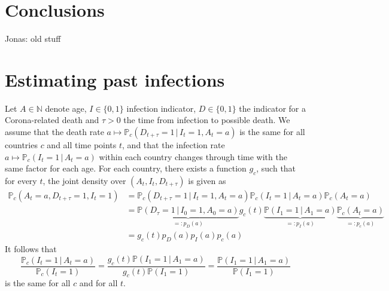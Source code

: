 \documentclass[a4paper]{article}
\newcommand\N{\mathbb{N}}
\renewcommand\P{\mathbb{P}}
\newcommand{\given}{\, \vert \,}
\newcommand\Jonas[1]{{\color{red}Jonas: #1}}
\begin{document}
\section{Conclusions}

\begin{center}
\end{center}




\Jonas{old stuff

\section{Estimating past infections}

Let $A \in \N$ denote age, $I \in \{0,1\}$ infection indicator, $D \in \{0,1\}$ the indicator for a Corona-related death and $\tau > 0$
the time from infection to possible death. We assume that the death rate $a \mapsto \P_c(D_{t+\tau} = 1 \given I_t = 1, A_t = a)$ is 
the same for all countries $c$ and all time points $t$, and that the infection rate $a \mapsto \P_c(I_{t} = 1 \given A_t = a)$ within 
each country changes through time with the same factor for each age. For each country, there exists a function $g_c$, such that for every $t$, the joint
density over $(A_t,I_t,D_{t+\tau})$ is given as
%
\begin{align*}
\P_c(A_t = a, D_{t+\tau} = 1, I_t = 1)	&= \P_c(D_{t+\tau} = 1 \given I_t = 1, A_t = a)  \P_c(I_t = 1 \given A_t = a) \P_c(A_t = a) \\
															&= \underbrace{\P(D_{\tau} = 1 \given I_0 = 1, A_0 = a)}_{=:p_D(a)} g_c(t) \underbrace{\P(I_1 = 1 \given A_1 = a)}_{=:p_I(a)} \underbrace{\P_c(A_t = a)}_{=:p_c(a)} \\
															&=  g_c(t) p_D(a) p_I(a) p_c(a)
\end{align*}
%
It follows that 
$$
\frac{\P_c(I_t = 1 \given A_t = a)}{\P_c(I_t = 1)} = \frac{g_c(t) \P(I_1 = 1 \given A_1 = a)}{g_c(t) \P(I_1 = 1)} = \frac{\P(I_1 = 1 \given A_1 = a)}{ \P(I_1 = 1)}
$$
is the same for all $c$ and for all $t$. 


}
\end{document}
